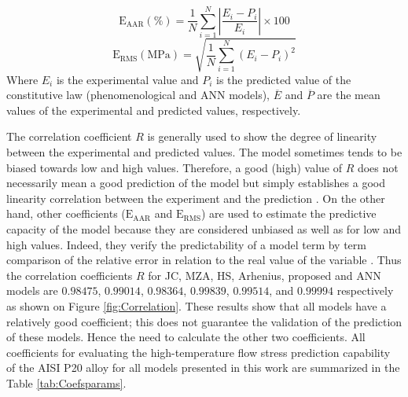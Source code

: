 \documentclass[twoside,english,1p,final,sort&compress]{elsarticle}
\theoremstyle{plain}
\newcommand{\RMSE}{\text{E}_\text{RMS}}
\newcommand{\AARE}{\text{E}_\text{AAR}}
\begin{document}
\begin{equation}
\label{eq:AARE-expression}
\AARE(\%) = \frac{1}{N}\displaystyle\sum_{i=1}^{N} \displaystyle\left\lvert\frac{E_i- P_i}{E_i} \right\rvert\times 100
\end{equation}
\begin{equation}
\label{eq:RMSE-expression}
\RMSE (\text{MPa}) = \sqrt{\frac{1}{N} \displaystyle\sum_{i=1}^{N} \left(E_i - P_i\right)^2}
\end{equation}
Where $E_i$ is the experimental value and $P_i$ is the predicted value of the constitutive law (phenomenological and ANN models), $\overline{E}$ and $\overline{P}$ are the mean values of the experimental and predicted values, respectively.

The correlation coefficient $R$ is generally used to show the degree of linearity between the experimental and predicted values. The model sometimes tends to be biased towards low and high values. Therefore, a good (high) value of $R$ does not necessarily mean a good prediction of the model but simply establishes a good linearity correlation between the experiment and the prediction \cite{Phaniraj-2003}. On the other hand, other coefficients ($\AARE$ and $\RMSE$) are used to estimate the predictive capacity of the model because they are considered unbiased as well as for low and high values. Indeed, they verify the predictability of a model term by term comparison of the relative error in relation to the real value of the variable \cite{Srinivasulu-2006}. Thus the correlation coefficients $R$ for JC, MZA, HS, Arhenius, proposed and ANN models are $0.98475$,  $0.99014$,  $0.98364$, $0.99839$, $0.99514$, and $0.99994$ respectively as shown on Figure \ref{fig:Correlation}. These results show that all models have a relatively good coefficient; this does not guarantee the validation of the prediction of these models. Hence the need to calculate the other two coefficients. All coefficients for evaluating the high-temperature flow stress prediction capability of the AISI P20 alloy for all models presented in this work are summarized in the Table \ref{tab:Coefsparams}.
\end{document}
